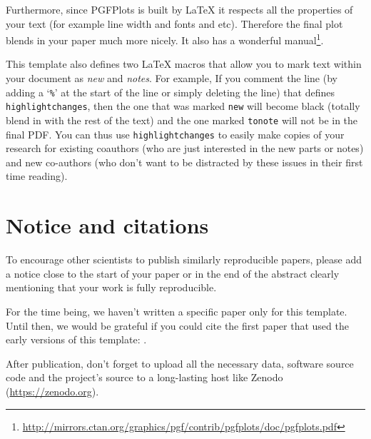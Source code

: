 \documentclass[10pt, twocolumn]{article}
\begin{document}
Furthermore, since {\small PGFP}lots is built by \LaTeX{} it respects all
the properties of your text (for example line width and fonts and
etc). Therefore the final plot blends in your paper much more nicely. It
also has a wonderful
manual\footnote{\url{http://mirrors.ctan.org/graphics/pgf/contrib/pgfplots/doc/pgfplots.pdf}}.

This template also defines two \LaTeX{} macros that allow you to mark text
within your document as \emph{new} and \emph{notes}. For example,   If you comment the line (by adding a `\texttt{\%}'
at the start of the line or simply deleting the line) that defines
\texttt{highlightchanges}, then the one that was marked \texttt{new} will
become black (totally blend in with the rest of the text) and the one
marked \texttt{tonote} will not be in the final PDF. You can thus use
\texttt{highlightchanges} to easily make copies of your research for
existing coauthors (who are just interested in the new parts or notes) and
new co-authors (who don't want to be distracted by these issues in their
first time reading).

\begin{figure}[t]

\end{figure}



\section{Notice and citations}
To encourage other scientists to publish similarly reproducible papers,
please add a notice close to the start of your paper or in the end of the
abstract clearly mentioning that your work is fully reproducible.

For the time being, we haven't written a specific paper only for this
template. Until then, we would be grateful if you could cite the first
paper that used the early versions of this template: \citet{gnuastro}.

After publication, don't forget to upload all the necessary data, software
source code and the project's source to a long-lasting host like Zenodo
(\url{https://zenodo.org}).
\end{document}
